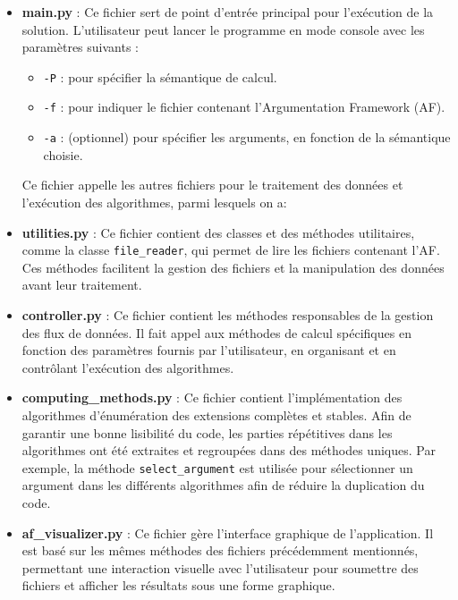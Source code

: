 \documentclass{rapportECL}
\begin{document}
\begin{itemize}
    \item \textbf{main.py} : Ce fichier sert de point d'entrée principal pour l'exécution de la solution. L'utilisateur peut lancer le programme en mode console avec les paramètres suivants :
    \begin{itemize}
        \item \texttt{-P} : pour spécifier la sémantique de calcul.
        \item \texttt{-f} : pour indiquer le fichier contenant l'Argumentation Framework (AF).
        \item \texttt{-a} : (optionnel) pour spécifier les arguments, en fonction de la sémantique choisie.
    \end{itemize}
    Ce fichier appelle les autres fichiers pour le traitement des données et l'exécution des algorithmes, parmi lesquels on a:

    \item \textbf{utilities.py} : Ce fichier contient des classes et des méthodes utilitaires, comme la classe \texttt{file\_reader}, qui permet de lire les fichiers contenant l'AF. Ces méthodes facilitent la gestion des fichiers et la manipulation des données avant leur traitement.

    \item \textbf{controller.py} : Ce fichier contient les méthodes responsables de la gestion des flux de données. Il fait appel aux méthodes de calcul spécifiques en fonction des paramètres fournis par l'utilisateur, en organisant et en contrôlant l'exécution des algorithmes.

    \item \textbf{computing\_methods.py} : Ce fichier contient l'implémentation des algorithmes d'énumération des extensions complètes et stables. Afin de garantir une bonne lisibilité du code, les parties répétitives dans les algorithmes ont été extraites et regroupées dans des méthodes uniques. Par exemple, la méthode \texttt{select\_argument} est utilisée pour sélectionner un argument dans les différents algorithmes afin de réduire la duplication du code.

    \item \textbf{af\_visualizer.py} : Ce fichier gère l'interface graphique de l'application. Il est basé sur les mêmes méthodes des fichiers précédemment mentionnés, permettant une interaction visuelle avec l'utilisateur pour soumettre des fichiers et afficher les résultats sous une forme graphique.
\end{itemize}
\end{document}
